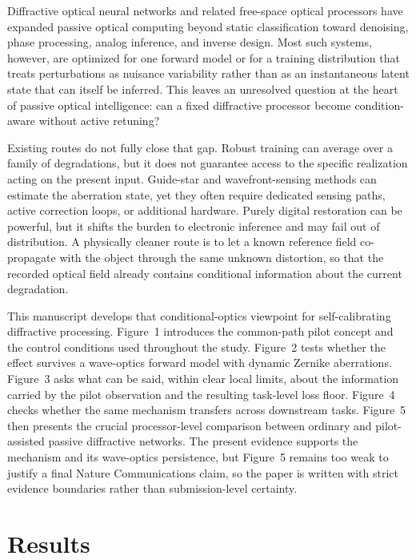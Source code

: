 \documentclass[11pt]{article}
\begin{document}
Diffractive optical neural networks and related free-space optical processors have expanded passive optical computing beyond static classification toward denoising, phase processing, analog inference, and inverse design. Most such systems, however, are optimized for one forward model or for a training distribution that treats perturbations as nuisance variability rather than as an instantaneous latent state that can itself be inferred. This leaves an unresolved question at the heart of passive optical intelligence: can a fixed diffractive processor become condition-aware without active retuning?

Existing routes do not fully close that gap. Robust training can average over a family of degradations, but it does not guarantee access to the specific realization acting on the present input. Guide-star and wavefront-sensing methods can estimate the aberration state, yet they often require dedicated sensing paths, active correction loops, or additional hardware. Purely digital restoration can be powerful, but it shifts the burden to electronic inference and may fail out of distribution. A physically cleaner route is to let a known reference field co-propagate with the object through the same unknown distortion, so that the recorded optical field already contains conditional information about the current degradation.

This manuscript develops that conditional-optics viewpoint for self-calibrating diffractive processing. Figure~1 introduces the common-path pilot concept and the control conditions used throughout the study. Figure~2 tests whether the effect survives a wave-optics forward model with dynamic Zernike aberrations. Figure~3 asks what can be said, within clear local limits, about the information carried by the pilot observation and the resulting task-level loss floor. Figure~4 checks whether the same mechanism transfers across downstream tasks. Figure~5 then presents the crucial processor-level comparison between ordinary and pilot-assisted passive diffractive networks. The present evidence supports the mechanism and its wave-optics persistence, but Figure~5 remains too weak to justify a final Nature Communications claim, so the paper is written with strict evidence boundaries rather than submission-level certainty.

\section{Results}
\end{document}
